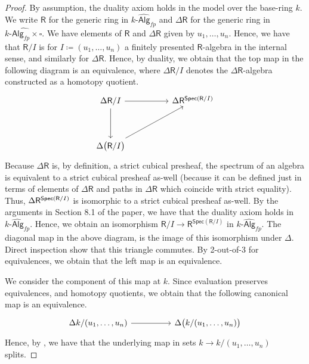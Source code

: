 \documentclass[10pt,a4paper]{article}
\DeclarePairedDelimiter\paren{(}{)}
\newcommand\R{\mathsf{R}}
\newcommand\Spec{\mathsf{Spec}}
\begin{document}
\begin{proof}
  By assumption, the duality axiom holds in the model over the base-ring $k$.
  We write $\R$ for the generic ring in $\widehat{k\textsf{-Alg}_{fp}}$ and $\Delta\R$ for the generic ring in $\widehat{k\textsf{-Alg}_{fp} \times \square}$.
  We have elements of $\R$ and $\Delta \R$ given by $u_1, \ldots, u_n$.
  Hence, we have that $\R/I$ is for $I \coloneqq (u_1, \ldots, u_n)$ a finitely presented $\R$-algebra in the internal sense, and similarly for $\Delta \R$.
  Hence, by duality, we obtain that the top map in the following diagram is an equivalence, where $\Delta \R/I$ denotes the $\Delta\R$-algebra constructed as a homotopy quotient.
  \[\begin{tikzcd}
    \Delta\R/I \arrow[dd] \arrow[rr]                &  & \Delta\R^{\Spec\paren{\R/I}} \\
                                                   &  &                                  \\
    \Delta\paren[\big]{\R/I} \arrow[rruu] &  &                                 
  \end{tikzcd}\]
  Because $\Delta\R$ is, by definition, a strict cubical presheaf, the spectrum of an algebra is equivalent to a strict cubical presheaf as-well (because it can be defined just in terms of elements of $\Delta \R$ and paths in $\Delta \R$ which coincide with strict equality).
  Thus, $\Delta\R^{\Spec\paren{\R/I}}$ is isomorphic to a strict cubical presheaf as-well.
  By the arguments in Section 8.1 of the paper, we have that the duality axiom holds in $\widehat{k\textsf{-Alg}_{fp}}$.
  Hence, we obtain an isomorphism $\R/I \to \R^{\Spec(\R / I)}$ in $\widehat{k\textsf{-Alg}_{fp}}$.
  The diagonal map in the above diagram, is the image of this isomorphism under \(\Delta\).
  Direct inspection show that this triangle commutes.
  By 2-out-of-3 for equivalences, we obtain that the left map is an equivalence.

  We consider the component of this map at $k$.
  Since evaluation preserves equivalences, and homotopy quotients, we obtain that the following canonical map is an equivalence.
  \[\begin{tikzcd}
    \Delta k/(u_1, \ldots, u_n) \arrow[rr] & & \Delta\paren[\big]{k/(u_1, \ldots, u_n)}                            
  \end{tikzcd}\]
  Hence, by , we have that the underlying map in sets $k \to k/(u_1, \ldots, u_n)$ splits. 
\end{proof}
\end{document}
